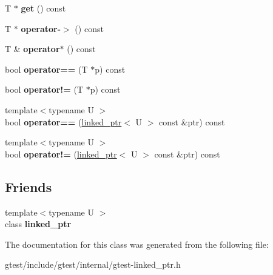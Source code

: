 \begin{DoxyCompactItemize}
T $\ast$ {\bfseries get} () const
\item 
\mbox{\label{classtesting_1_1internal_1_1linked__ptr_a23ff85ac97eed03e945034b65c8eb900}} 
T $\ast$ {\bfseries operator-\/$>$} () const
\item 
\mbox{\label{classtesting_1_1internal_1_1linked__ptr_ac94ad266bf41cbf979a95ca2870908d9}} 
T \& {\bfseries operator$\ast$} () const
\item 
\mbox{\label{classtesting_1_1internal_1_1linked__ptr_ad87ac8ff5543b6fad66e2f3c9844581a}} 
bool {\bfseries operator==} (T $\ast$p) const
\item 
\mbox{\label{classtesting_1_1internal_1_1linked__ptr_a10305395af92bd2fec7bca085cabc99c}} 
bool {\bfseries operator!=} (T $\ast$p) const
\item 
\mbox{\label{classtesting_1_1internal_1_1linked__ptr_a79306e959a4ae7b3a9da641d2ba06ce6}} 
{\footnotesize template$<$typename U $>$ }\\bool {\bfseries operator==} (\hyperlink{classtesting_1_1internal_1_1linked__ptr}{linked\+\_\+ptr}$<$ U $>$ const \&ptr) const
\item 
\mbox{\label{classtesting_1_1internal_1_1linked__ptr_a4801114a83a9e12b08f90e0d28318f26}} 
{\footnotesize template$<$typename U $>$ }\\bool {\bfseries operator!=} (\hyperlink{classtesting_1_1internal_1_1linked__ptr}{linked\+\_\+ptr}$<$ U $>$ const \&ptr) const
\end{DoxyCompactItemize}
\subsection*{Friends}
\begin{DoxyCompactItemize}
\item 
\mbox{\label{classtesting_1_1internal_1_1linked__ptr_a7763f286ca03a7f7363a033d996c8c1c}} 
{\footnotesize template$<$typename U $>$ }\\class {\bfseries linked\+\_\+ptr}
\end{DoxyCompactItemize}


The documentation for this class was generated from the following file\+:\begin{DoxyCompactItemize}
\item 
gtest/include/gtest/internal/gtest-\/linked\+\_\+ptr.\+h\end{DoxyCompactItemize}
